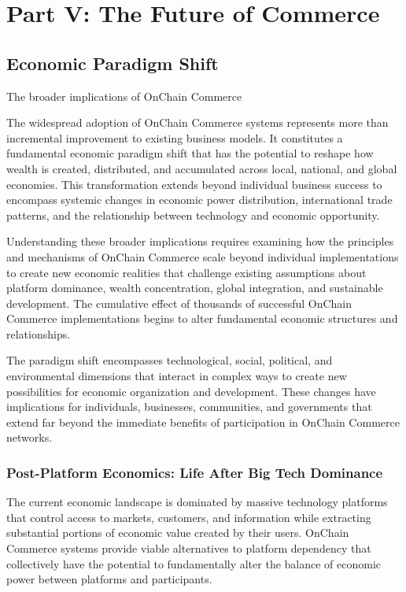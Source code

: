 \documentclass[
  Letterpaper,
]{scrbook}
\begin{document}
\part{Part V: The Future of Commerce}

\chapter{Economic Paradigm Shift}\label{sec-paradigm-shift}

The broader implications of OnChain Commerce

The widespread adoption of OnChain Commerce systems represents more than
incremental improvement to existing business models. It constitutes a
fundamental economic paradigm shift that has the potential to reshape
how wealth is created, distributed, and accumulated across local,
national, and global economies. This transformation extends beyond
individual business success to encompass systemic changes in economic
power distribution, international trade patterns, and the relationship
between technology and economic opportunity.

Understanding these broader implications requires examining how the
principles and mechanisms of OnChain Commerce scale beyond individual
implementations to create new economic realities that challenge existing
assumptions about platform dominance, wealth concentration, global
integration, and sustainable development. The cumulative effect of
thousands of successful OnChain Commerce implementations begins to alter
fundamental economic structures and relationships.

The paradigm shift encompasses technological, social, political, and
environmental dimensions that interact in complex ways to create new
possibilities for economic organization and development. These changes
have implications for individuals, businesses, communities, and
governments that extend far beyond the immediate benefits of
participation in OnChain Commerce networks.

\section{Post-Platform Economics: Life After Big Tech
Dominance}\label{post-platform-economics-life-after-big-tech-dominance}

The current economic landscape is dominated by massive technology
platforms that control access to markets, customers, and information
while extracting substantial portions of economic value created by their
users. OnChain Commerce systems provide viable alternatives to platform
dependency that collectively have the potential to fundamentally alter
the balance of economic power between platforms and participants.
\end{document}
